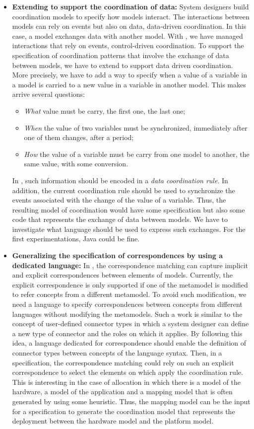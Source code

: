 \begin{itemize}
	\item \textbf{Extending \bcool to support the coordination of data:} System designers build coordination models to specify how models interact. The interactions between models can rely on events but also on data, \ie data-driven coordination. In this case, a model exchanges data with another model. With \bcool, we have managed interactions that rely on events, \ie control-driven coordination. To support the specification of coordination patterns that involve the exchange of data between models, we have to extend \bcool to support data driven coordination. More precisely, we have to add a way to specify when a value of a variable in a model is carried to a new value in a variable in another model. This makes arrive several questions:
			\begin{itemize}
				\item \emph{What} value must be carry, \eg the first one, the last one;
				\item \emph{When} the value of two variables must be synchronized, \eg immediately after one of them changes, after a period;
				\item \emph{How} the value of a variable must be carry from one model to another, \eg the same value, with some conversion. 
			\end{itemize}
	In \bcool, such information should be encoded in a \emph{data coordination rule}. In addition, the current coordination rule should be used to synchronize the events associated with the change of the value of a variable. Thus, the resulting model of coordination would have some \ccsl specification but also some code that represents the exchange of data between models. We have to investigate what language should be used to express such exchanges. For the first experimentations, Java could be fine.    	 
	\item \textbf{Generalizing the specification of correspondences by using a dedicated language:} In \bcool, the correspondence matching can capture implicit and explicit correspondences between elements of models. Currently, the explicit correspondence is only supported if one of the metamodel is modified to refer concepts from a different metamodel. To avoid such modification, we need a language to specify correspondences between concepts from different languages without modifying the metamodels. Such a work is similar to the concept of user-defined connector types in which a system designer can define a new type of connector and the roles on which it applies. By following this idea, a language dedicated for correspondence should enable the definition of connector types between concepts of the language syntax. Then, in a \bcool specification, the correspondence matching could rely on such an explicit correspondence to select the elements on which apply the coordination rule. This is interesting in the case of allocation in which there is a model of the hardware, a model of the application and a mapping model that is often generated by using some heuristic. Thus, the mapping model can be the input for a \bcool specification to generate the coordination model that represents the deployment between the hardware model and the platform model.

\end{itemize}
